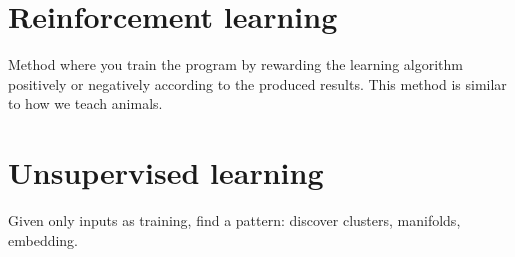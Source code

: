 \documentclass[11pt]{article}
\begin{document}
\section{Reinforcement learning}
\label{sec:orgcd35180}
Method where you train the program by rewarding the learning algorithm positively or
negatively according to the produced results. This method is similar to how we teach
animals.
\section{Unsupervised learning}
\label{sec:orgae4d9a1}
Given only inputs as training, find a pattern: discover clusters, manifolds, embedding.
\end{document}
